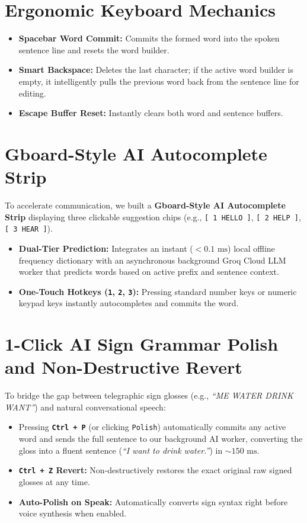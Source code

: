 \section{Ergonomic Keyboard Mechanics}
\begin{itemize}
    \item \textbf{Spacebar Word Commit:} Commits the formed word into the spoken sentence line and resets the word builder.
    \item \textbf{Smart Backspace:} Deletes the last character; if the active word builder is empty, it intelligently pulls the previous word back from the sentence line for editing.
    \item \textbf{Escape Buffer Reset:} Instantly clears both word and sentence buffers.
\end{itemize}

\section{Gboard-Style AI Autocomplete Strip}
To accelerate communication, we built a \textbf{Gboard-Style AI Autocomplete Strip} displaying three clickable suggestion chips (e.g., \texttt{[ 1  HELLO ]}, \texttt{[ 2  HELP ]}, \texttt{[ 3  HEAR ]}).
\begin{itemize}
    \item \textbf{Dual-Tier Prediction:} Integrates an instant ($<0.1\text{ ms}$) local offline frequency dictionary with an asynchronous background Groq Cloud LLM worker that predicts words based on active prefix and sentence context.
    \item \textbf{One-Touch Hotkeys (\texttt{1}, \texttt{2}, \texttt{3}):} Pressing standard number keys or numeric keypad keys instantly autocompletes and commits the word.
\end{itemize}

\section{1-Click AI Sign Grammar Polish and Non-Destructive Revert}
To bridge the gap between telegraphic sign glosses (e.g., \textit{``ME WATER DRINK WANT''}) and natural conversational speech:
\begin{itemize}
    \item Pressing \textbf{\texttt{Ctrl + P}} (or clicking \texttt{Polish}) automatically commits any active word and sends the full sentence to our background AI worker, converting the gloss into a fluent sentence (\textit{``I want to drink water.''}) in $\sim 150\text{ ms}$.
    \item \textbf{\texttt{Ctrl + Z} Revert:} Non-destructively restores the exact original raw signed glosses at any time.
    \item \textbf{Auto-Polish on Speak:} Automatically converts sign syntax right before voice synthesis when enabled.
\end{itemize}

